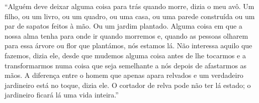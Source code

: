 ``Alguém deve deixar alguma coisa para trás quando morre, dizia o meu avô. Um filho, ou um livro, ou um quadro, ou uma casa, ou uma parede construída ou um par de sapatos feitos à mão. Ou um jardim plantado. Alguma coisa em que a nossa alma tenha para onde ir quando morremos e, quando as pessoas olharem para essa árvore ou flor que plantámos, nós estamos lá. Não interessa aquilo que fazemos, dizia ele, desde que mudemos alguma coisa antes de lhe tocarmos e a transformarmos numa coisa que seja semelhante a nós depois de afastarmos as mãos. A diferença entre o homem que apenas apara relvados e um verdadeiro jardineiro está no toque, dizia ele. O cortador de relva pode não ter lá estado; o jardineiro ficará lá uma vida inteira.''


